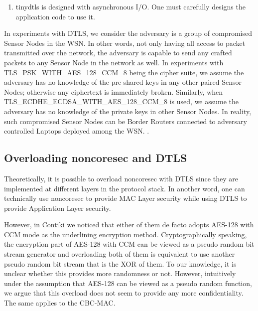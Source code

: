 \begin{enumerate}
\item tinydtls is designed with asynchronous I/O. One must carefully designs the application code to use it.
\end{enumerate}

In experiments with DTLS, we consider the adversary is a group of compromised Sensor Nodes in the WSN. In other words, not only having all access to packet transmitted over the network, the adversary is capable to send any crafted packets to any Sensor Node in the network as well. In experiments with TLS\_PSK\_WITH\_AES\_128\_CCM\_8 being the cipher suite, we assume the adversary has no knowledge of the pre shared keys in any other paired Sensor Nodes; otherwise any ciphertext is immediately broken. Similarly, when TLS\_ECDHE\_ECDSA\_WITH\_AES\_128\_CCM\_8 is used, we assume the adversary has no knowledge of the private keys in other Sensor Nodes. In reality, such compromised Sensor Nodes can be Border Routers connected to adversary controlled Laptops deployed among the WSN. .

\subsection{Overloading noncoresec and DTLS} \label{Overload Sec}

Theoretically, it is possible to overload noncoresec with DTLS since they are implemented at different layers in the protocol stack. In another word, one can technically use noncoresec to provide MAC Layer security while using DTLS to provide Application Layer security.

However, in Contiki we noticed that either of them de facto adopts AES-128 with CCM mode as the underlining encryption method. Cryptographically speaking, the encryption part of AES-128 with CCM can be viewed as a pseudo random bit stream generator and overloading both of them is equivalent to use another pseudo random bit stream that is the XOR of them. To our knowledge, it is unclear whether this provides more randomness or not. However, intuitively under the assumption that AES-128 can be viewed as a pseudo random function, we argue that this overload does not seem to provide any more confidentiality. The same applies to the CBC-MAC.

